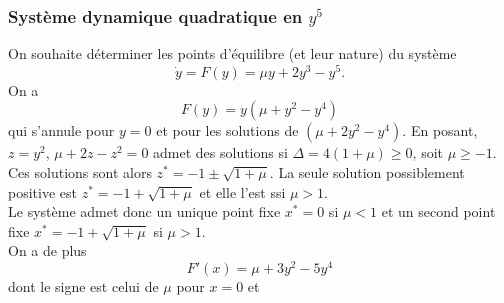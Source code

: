 \subsubsection{Système dynamique quadratique en $y^5$ \todo{}}

On souhaite déterminer les points d'équilibre (et leur nature) du système
$$
\dot y = F(y) = \mu y + 2 y^3 - y^5.
$$
On a 
$$
F(y) = y(\mu + y^2 - y^4)
$$
qui s'annule pour $y = 0$ et pour les solutions de $(\mu + 2 y^2 - y^4)$. En posant, $z = y^2$, $\mu + 2 z - z^2 = 0$ admet des solutions si $\Delta =  4(1 + \mu) \geq 0$, soit $\mu \geq -1$. Ces solutions sont alors $z^* = -1 \pm \sqrt{1+\mu}$. La seule solution possiblement positive est $z^* = -1 + \sqrt{1+\mu}$ et elle l'est ssi $\mu > 1$. \\
Le système admet donc un unique point fixe $x^*=0$ si $\mu < 1$ et un second point fixe $x^* = -1+\sqrt{1+\mu}$ si $\mu > 1$. \\
On a de plus
$$
F'(x) = \mu + 3 y^2 - 5y^4
$$
dont le signe est celui de $\mu$ pour $x=0$ et 
